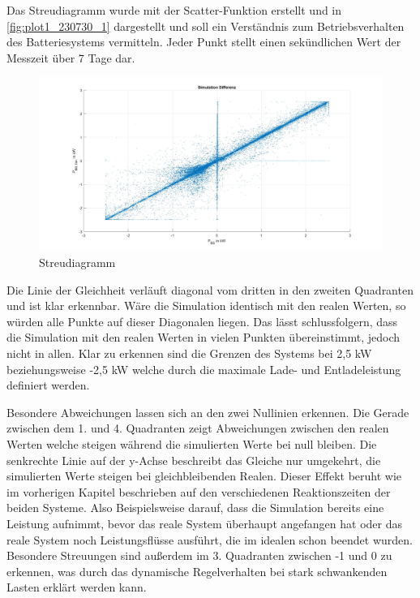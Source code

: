 Das Streudiagramm wurde mit der Scatter-Funktion erstellt und in \autoref{fig:plot1_230730_1} dargestellt und soll ein Verständnis zum Betriebsverhalten des Batteriesystems vermitteln. Jeder Punkt stellt einen sekündlichen Wert der Messzeit über 7 Tage dar.
\begin{figure}[H]
    \centering
    \includegraphics[width=\textwidth]{Abbildungen/streudiagramm.jpg}
    \caption{Streudiagramm}
    \label{fig:plot1_230730_1}
\end{figure}



Die Linie der Gleichheit verläuft diagonal vom dritten in den zweiten Quadranten und ist klar erkennbar. Wäre die Simulation identisch mit den realen Werten, so würden alle Punkte auf dieser Diagonalen liegen. Das lässt schlussfolgern, dass die Simulation mit den realen Werten in vielen Punkten übereinstimmt, jedoch nicht in allen.
Klar zu erkennen sind die Grenzen des Systems bei 2,5 kW beziehungsweise -2,5 kW welche durch die maximale Lade- und Entladeleistung definiert werden.

Besondere Abweichungen lassen sich an den zwei Nullinien erkennen. Die Gerade zwischen dem 1. und 4. Quadranten zeigt Abweichungen zwischen den realen Werten welche steigen während die simulierten Werte bei null bleiben. Die senkrechte Linie auf der y-Achse beschreibt das Gleiche nur umgekehrt, die simulierten Werte steigen bei gleichbleibenden Realen. Dieser Effekt beruht wie im vorherigen Kapitel beschrieben auf den verschiedenen Reaktionszeiten der beiden Systeme. 
Also Beispielsweise darauf, dass die Simulation bereits eine Leistung aufnimmt, bevor das reale System überhaupt angefangen hat oder das reale System noch Leistungsflüsse ausführt, die im idealen schon beendet wurden.
Besondere Streuungen sind außerdem im 3. Quadranten zwischen -1 und 0 zu erkennen, was durch das dynamische Regelverhalten bei stark schwankenden Lasten erklärt werden kann. 

